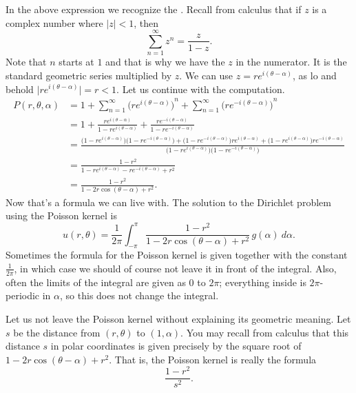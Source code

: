 In the above expression we recognize the
\emph{}.
Recall from calculus that if $z$ is a complex number where $\lvert z \rvert < 1$, then
\begin{equation*}
\sum_{n=1}^\infty z^n = \frac{z}{1-z} .
\end{equation*}
Note that $n$ starts at $1$ and that is why we have the $z$ in the numerator.
It is the standard geometric series multiplied by $z$.
We can use $z = re^{i(\theta-\alpha)}$, as
lo and behold $\lvert re^{i(\theta-\alpha)} \rvert = r < 1$.
Let us
continue with the computation.
\begin{equation*}
\begin{split}
P(r,\theta,\alpha)
& =
1
+
\sum_{n=1}^\infty
{\bigl(
re^{i(\theta-\alpha)}\bigr)}^{n}
+
\sum_{n=1}^\infty
{\bigl(
re^{-i(\theta-\alpha)}\bigr)}^{n}
\\
& =
1
+
\frac{re^{i(\theta-\alpha)}}{1-re^{i(\theta-\alpha)}}
+
\frac{re^{-i(\theta-\alpha)}}{1-re^{-i(\theta-\alpha)}}
\\
& = 
\frac{
\bigl(1-re^{i(\theta-\alpha)}\bigr)\bigl(1-re^{-i(\theta-\alpha)}\bigr)
+
\bigl(1-re^{-i(\theta-\alpha)}\bigr)re^{i(\theta-\alpha)} +
\bigl(1-re^{i(\theta-\alpha)}\bigr)re^{-i(\theta-\alpha)}}
{\bigl(1-re^{i(\theta-\alpha)}\bigr)\bigl(1-re^{-i(\theta-\alpha)}\bigr)}
\\
& = 
\frac{1 -r^2}{1 - re^{i(\theta-\alpha)} - re^{-i(\theta-\alpha)} +r^2}
\\
& = 
\frac{1 -r^2}{1 - 2r\cos(\theta-\alpha) +r^2} .
\end{split}
\end{equation*}
Now that's a formula we can live with.  The
solution to the Dirichlet problem using the Poisson kernel is
\begin{equation*}
\boxed{~~
u(r,\theta) = 
\frac{1}{2\pi} \int_{-\pi}^{\pi}
\frac{1 -r^2}{1 - 2r\cos(\theta-\alpha) +r^2} \, g(\alpha) ~ d\alpha .
~~}
\end{equation*}
Sometimes the formula for the Poisson kernel is
given together with the constant $\frac{1}{2\pi}$, in which case we should
of course not leave it in front of the integral.
Also, often the limits
of the integral are given as 0 to $2\pi$; everything inside is
$2\pi$-periodic in $\alpha$, so this does not change the integral.

\begin{diffyfloatingfigurer}{2.1in}{2.4in}
\noindent
{}
\end{diffyfloatingfigurer}
Let us not leave the Poisson kernel without explaining its geometric
meaning.  Let $s$ be the distance from $(r,\theta)$ to
$(1,\alpha)$.
You may recall from calculus that
this distance $s$ in polar coordinates is given precisely by the square root
of $1 - 2r\cos(\theta-\alpha) +r^2$.  That is, the Poisson kernel is really
the formula
\begin{equation*}
\frac{1-r^2}{s^2} .
\end{equation*}

